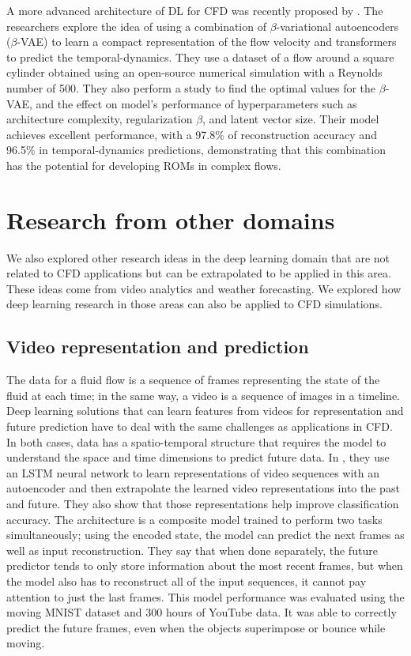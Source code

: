 A more advanced architecture of DL for CFD was recently proposed by \cite{wang_towards_2024}. The researchers explore the idea of using a combination of $\beta$-variational autoencoders ($\beta$-VAE) \cite{eivazi_towards_2022} to learn a compact representation of the flow velocity and transformers to predict the temporal-dynamics. They use a dataset of a flow around a square cylinder obtained using an open-source numerical simulation with a Reynolds number of 500. They also perform a study to find the optimal values for the $\beta$-VAE, and the effect on model’s performance of hyperparameters such as architecture complexity, regularization $\beta$, and latent vector size. Their model achieves excellent performance, with a 97.8\% of reconstruction accuracy and 96.5\% in temporal-dynamics predictions, demonstrating that this combination has the potential for developing ROMs in complex flows.


\section{Research from other domains}
\label{sec:ResearchOtherDomains}

We also explored other research ideas in the deep learning domain that are not related to CFD applications but can be extrapolated to be applied in this area. These ideas come from video analytics and weather forecasting. We explored how deep learning research in those areas can also be applied to CFD simulations.


\subsection*{\textbf{Video representation and prediction}}
The data for a fluid flow is a sequence of frames representing the state of the fluid at each time; in the same way, a video is a sequence of images in a timeline. Deep learning solutions that can learn features from videos for representation and future prediction have to deal with the same challenges as applications in CFD. In both cases, data has a spatio-temporal structure that requires the model to understand the space and time dimensions to predict future data. In \cite{srivastava_unsupervised_2015}, they use an LSTM neural network to learn representations of video sequences with an autoencoder and then extrapolate the learned video representations into the past and future. They also show that those representations help improve classification accuracy. The architecture is a composite model trained to perform two tasks simultaneously; using the encoded state, the model can predict the next frames as well as input reconstruction. They say that when done separately, the future predictor tends to only store information about the most recent frames, but when the model also has to reconstruct all of the input sequences, it cannot pay attention to just the last frames. This model performance was evaluated using the moving MNIST dataset and 300 hours of YouTube data. It was able to correctly predict the future frames, even when the objects superimpose or bounce while moving.


